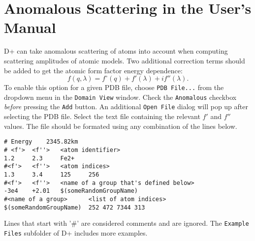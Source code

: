 \documentclass[12pt,a4paper,openany,oneside,oldfontcommands]{memoir}
\begin{document}
\section{Anomalous Scattering in the User's Manual} \label{sec:anomalousScattering}
D+ can take anomalous scattering of atoms into account when computing scattering amplitudes of atomic models. Two additional correction terms should be added to get the atomic form factor energy dependence:
\begin{equation*}
	f(q,\lambda) = f^\circ(q) + f'(\lambda) + i f''(\lambda).
\end{equation*}
To enable this option for a given PDB file, choose \texttt{PDB File...} from the dropdown menu in the \texttt{Domain View} window.
Check the \texttt{Anomalous} checkbox \textit{before} pressing the \texttt{Add} button.
An additional \texttt{Open File} dialog will pop up after selecting the PDB file.
Select the text file containing the relevant $f'$ and $f''$ values.
The file should be formated using any combination of the lines below.


\begin{lstlisting}
# Energy    2345.82km
# <f'>  <f''>   <atom identifier>
1.2     2.3     Fe2+
#<f'>   <f''>   <atom indices>
1.3     3.4     125     256
#<f'>   <f''>   <name of a group that's defined below>
-3e4    +2.01   $(someRandomGroupName)
#<name of a group>      <list of atom indices>
$(someRandomGroupName)  252 472 7344 313
\end{lstlisting}

Lines that start with '\#' are considered comments and are ignored.
The \texttt{Example Files} subfolder of D+ includes more examples. 
\end{document}
